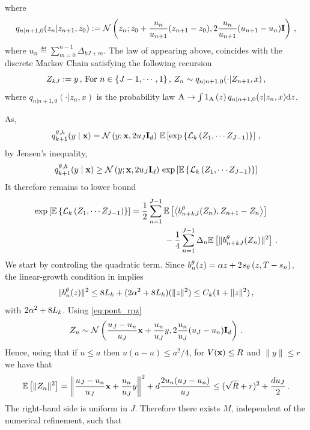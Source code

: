 \documentclass[11pt]{article}
\theoremstyle{plain}
\theoremstyle{definition}
\theoremstyle{remark}
\begin{document}
where
\begin{equation*}
    q_{n|n+1,0}(z_{n}|z_{n+1}, z_0) \eqdef \gaussiand{z_0 + \frac{u_n}{u_{n+1}}(z_{n+1} - z_0)}{2\frac{u_n}{u_{n+1}}(u_{n+1}-u_n)\Id}[z_n]\eqsp,
\end{equation*}
where $u_n \eqdef \sum_{m=0}^{n-1}\Delta_{kJ + m}$.
%
The law of appearing above, coincides with the discrete Markov Chain satisfying the following recursion 
\begin{equation*}
    Z_{kJ} := y\,, \,
    \text{For } n \in \{J-1, \cdots, 1\} \,, \,
    Z_{n} \sim q_{n|n+1, 0}(\cdot | Z_{n+1}, x) \,,
\end{equation*}
where $q_{n|n+1, 0}(\cdot | z_{n}, x)$ is the probability law $\set{A} \rightarrow \int \indi{\set{A}}[z] q_{n|n+1, 0}(z | z_{n}, x) \rmd z$.

As,
$$
q_{k+1}^{\theta,h}(y\mid\x)
= \gaussiand{y;\x}{2u_J\Id_\xdim} \, \E \left[ \exp\left\{ \mathcal L_k \left( Z_{1}, \cdots Z_{J - 1} \right) \right\} \right] \eqsp,
$$
by Jensen's inequality,
$$
q_{k+1}^{\theta,h}(y\mid\x)
\geq \gaussiand{y;\x}{2u_J\Id_\xdim} \,   \exp\left[\E\left\{ \mathcal L_k \left( Z_{1}, \cdots Z_{J - 1} \right) \right\} \right]
$$
It therefore remains to lower bound 
\begin{align*}
\exp\left[\mathbb{E}\left\{ \mathcal L_k \left( Z_{1}, \cdots Z_{J - 1} \right) \right\} \right]
&= \frac{1}{2} \sum_{n=1}^{J-1} \mathbb{E} \left[ \left<b_{n+kJ}^\theta(Z_n), Z_{n+1}-Z_n\right>\right] \\
& \qquad \qquad -\frac14 \sum_{n=1}^{J-1} \Delta_n \mathbb{E} \left[ \|b_{n+kJ}^\theta(Z_n)\|^2 \right] \,.
\end{align*}
%
We start by controling the quadratic term.  Since $b_n^\theta(z)=\isvp z+2\scorenet[T-s_n][z][\theta]$, the linear-growth condition in  implies
$$
\| b_n^\theta(z) \|^2 \le 8L_k + ( 2 \alpha^2 + 8 L_k )(\|z\|^2) \le C_k (1 + \|z\|^2) \,,
$$
with $2\alpha^2+8L_k$. Using \eqref{eq:pont_rpz}
\begin{equation}
    \label{eq:pont_marginal}
Z_n \sim \gaussiand{ \frac{u_{J} - u_n}{u_J}\x+\frac{u_n}{u_J}y }{ 2\frac{u_n}{u_J}(u_J - u_n)\Id_\xdim } \eqsp.    
\end{equation}
Hence, using that if $u \le a$ then $u (a-u) \le a^2/4$, for $V(\mathbf{x})\le R$ and $\|y\|\le r$ we have that
$$
\mathbb{E} \left[ \|Z_n\|^2\right] = \left\| \frac{u_J-u_n}{u_J} \mathbf{x} + \frac{u_n}{u_J}y \right\|^2 + d \frac{2u_n(u_J-u_n)}{u_J}
\le (\sqrt R+r)^2+\frac{d u_J}{2} \,.
$$
The right-hand side is uniform in $J$. Therefore there exists $M$, independent of the numerical refinement, such that
\end{document}
